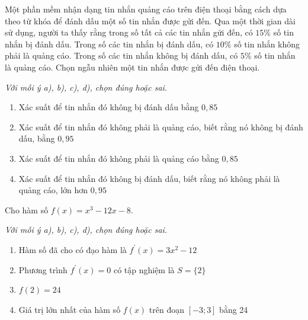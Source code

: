 \documentclass{exam}
\begin{document}
\begin{question}
Một phần mềm nhận dạng tin nhắn quảng cáo trên điện thoại bằng cách dựa theo từ khóa để đánh dấu một số tin nhắn được gửi đến. Qua một thời gian dài sử dụng, người ta thấy rằng trong số tất cả các tin nhắn gửi đến, có $15 \%$ số tin nhắn bị đánh dấu. Trong số các tin nhắn bị đánh dấu, có $10 \%$ số tin nhắn không phải là quảng cáo. Trong số các tin nhắn không bị đánh dấu, có $5 \%$ số tin nhắn là quảng cáo.
Chọn ngẫu nhiên một tin nhắn được gửi đến điện thoại.

\par\vspace{0.15em}
{\small\textit{Với mỗi ý a), b), c), d), chọn đúng hoặc sai.}}
\par\vspace{0.1em}
\begin{enumerate}[label=\textbf{\alph*)}, leftmargin=1.6em, itemsep=0.2em, topsep=0.2em]

\item Xác suất để tin nhắn đó không bị đánh dấu bằng $0,85$

\item Xác suất để tin nhắn đó không phải là quảng cáo, biết rằng nó không bị đánh dấu, bằng $0,95$

\item Xác suất để tin nhắn đó không phải là quảng cáo bằng $0,85$

\item Xác suất để tin nhắn đó không bị đánh dấu, biết rằng nó không phải là quảng cáo, lớn hơn $0,95$

\end{enumerate}

\end{question}





\begin{question}
Cho hàm số $f(x)=x^3-12x-8$.

\par\vspace{0.15em}
{\small\textit{Với mỗi ý a), b), c), d), chọn đúng hoặc sai.}}
\par\vspace{0.1em}
\begin{enumerate}[label=\textbf{\alph*)}, leftmargin=1.6em, itemsep=0.2em, topsep=0.2em]

\item Hàm số đã cho có đạo hàm là $f^{\prime}(x)=3x^2-12$

\item Phương trình $f^{\prime}(x)=0$ có tập nghiệm là $S=\{2\}$

\item $f(2)=24$

\item Giá trị lớn nhất của hàm số $f(x)$ trên đoạn $[-3; 3]$ bằng 24

\end{enumerate}

\end{question}
\end{document}

